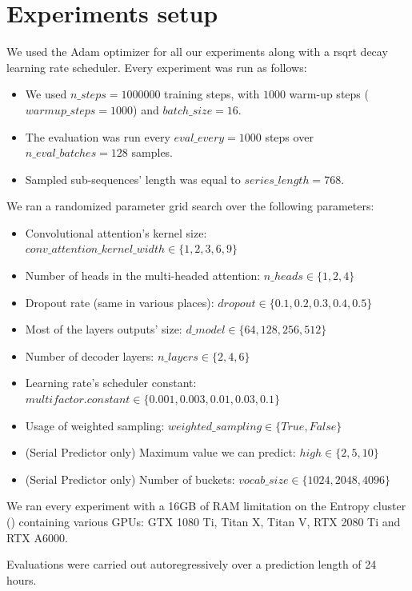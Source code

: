\documentclass[en]{pracamgr}
\begin{document}
\section{Experiments setup}

We used the Adam optimizer for all our experiments along with a rsqrt decay learning rate scheduler.
Every experiment was run as follows:
\begin{itemize}
	\item We used $n\_steps = 1000000$ training steps, with $1000$ warm-up steps  ($warmup\_steps = 1000$) and $batch\_size = 16$.
	\item The evaluation was run every $eval\_every = 1000$ steps over $n\_eval\_batches = 128$ samples.
	\item Sampled sub-sequences' length was equal to $series\_length = 768$.
\end{itemize}
We ran a randomized parameter grid search over the following parameters:
\begin{itemize}
	\item Convolutional attention's kernel size: $conv\_attention\_kernel\_width \in \{ 1, 2, 3, 6, 9 \}$
	\item Number of heads in the multi-headed attention: $ n\_heads \in \{ 1, 2, 4 \} $
	\item Dropout rate (same in various places): $dropout \in \{ 0.1, 0.2, 0.3, 0.4, 0.5 \} $
	\item Most of the layers outputs' size: $d\_model \in \{ 64, 128, 256, 512 \} $
	\item Number of decoder layers: $n\_layers \in \{ 2, 4, 6 \}$
	\item Learning rate's scheduler constant: $multifactor.constant \in \{ 0.001, 0.003, 0.01, 0.03, 0.1 \}$
	\item Usage of weighted sampling: $weighted\_sampling \in \{ True, False \}$
	\item (Serial Predictor only) Maximum value we can predict: $high \in \{2, 5, 10\}$ 
	\item (Serial Predictor only) Number of buckets: $vocab\_size \in \{1024, 2048, 4096\}$ 
\end{itemize}

We ran every experiment with a 16GB of RAM limitation on the Entropy cluster (\cite{entropy}) containing various GPUs: GTX 1080 Ti, Titan X, Titan V, RTX 2080 Ti and RTX A6000.


Evaluations were carried out autoregressively over a prediction length of 24 hours.
\end{document}
